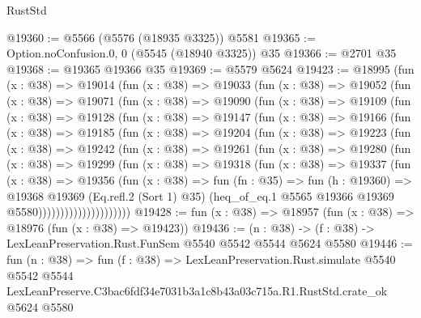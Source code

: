 \begin{lexlean}{RustStd}
\begin{coremodule}
@19360 := @5566 (@5576 (@18935 @3325)) @5581
@19365 := Option.noConfusion.{0, 0} (@5545 (@18940 @3325)) @35
@19366 := @2701 @35
@19368 := @19365 @19366 @35
@19369 := @5579 @5624
@19423 := @18995
    (fun (x : @38) =>
    @19014
      (fun (x : @38) =>
      @19033
        (fun (x : @38) =>
        @19052
          (fun (x : @38) =>
          @19071
            (fun (x : @38) =>
            @19090
              (fun (x : @38) =>
              @19109
                (fun (x : @38) =>
                @19128
                  (fun (x : @38) =>
                  @19147
                    (fun (x : @38) =>
                    @19166
                      (fun (x : @38) =>
                      @19185
                        (fun (x : @38) =>
                        @19204
                          (fun (x : @38) =>
                          @19223
                            (fun (x : @38) =>
                            @19242
                              (fun (x : @38) =>
                              @19261
                                (fun (x : @38) =>
                                @19280
                                  (fun (x : @38) =>
                                  @19299
                                    (fun (x : @38) =>
                                    @19318
                                      (fun (x : @38) =>
                                      @19337
                                        (fun (x : @38) =>
                                        @19356
                                          (fun (x : @38) =>
                                          fun (fn : @35) =>
                                          fun (h : @19360) =>
                                          @19368
                                            @19369
                                            (Eq.refl.{2} (Sort 1) @35)
                                            (heq_of_eq.{1}
                                              @5565
                                              @19366
                                              @19369
                                              @5580)))))))))))))))))))))
@19428 := fun (x : @38) => @18957 (fun (x : @38) => @18976 (fun (x : @38) => @19423))
@19436 := (n : @38) -> (f : @38) -> LexLeanPreservation.Rust.FunSem @5540 @5542 @5544 @5624 @5580
@19446 := fun (n : @38) =>
  fun (f : @38) =>
  LexLeanPreservation.Rust.simulate
    @5540
    @5542
    @5544
    LexLeanPreserve.C3bac6fdf34e7031b3a1c8b43a03c715a.R1.RustStd.crate_ok
    @5624
    @5580
\end{coremodule}
\end{lexlean}
